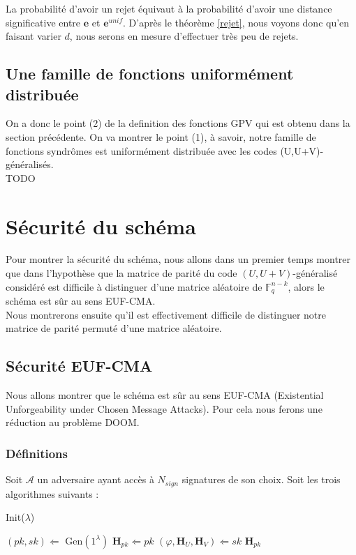 \documentclass[12pt]{article}
\theoremstyle{plain}
\newcommand{\F}{\mathbb{F}}
\newcommand{\e}{\mathbf{e}}
\begin{document}
La probabilité d'avoir un rejet équivaut à la probabilité d'avoir une distance significative entre $\e$ et $\e^{unif}$. D'après le théorème \ref{rejet}, nous voyons donc qu'en faisant varier $d$, nous serons en mesure d'effectuer très peu de rejets.


\subsection{Une famille de fonctions uniformément distribuée}
On a donc le point (2) de la definition des fonctions GPV qui est obtenu dans la section précédente. On va montrer le point (1), à savoir, notre famille de fonctions syndrômes est uniformément distribuée avec les codes (U,U+V)-généralisés. \\
TODO


\section{Sécurité du schéma}
Pour montrer la sécurité du schéma, nous allons dans un premier temps montrer que dans l'hypothèse que la matrice de parité du code $(U,U+V)$-généralisé considéré est difficile à distinguer d'une matrice aléatoire de $\F_q^{n-k}$, alors le schéma est sûr au sens EUF-CMA.\\
Nous montrerons ensuite qu'il est effectivement difficile de distinguer notre matrice de parité permuté d'une matrice aléatoire. \\

\subsection{Sécurité EUF-CMA}
Nous allons montrer que le schéma est sûr au sens EUF-CMA (Existential Unforgeability under Chosen Message Attacks). Pour cela nous ferons une réduction au problème DOOM.
\subsubsection{Définitions}

Soit $\mathcal{A}$ un adversaire ayant accès à $N_{sign}$ signatures de son choix. Soit les trois algorithmes suivants :


\begin{algorithm} [h]
	\caption{Init($\lambda$)}
	\begin{algorithmic}[1]
    	\STATE $(pk,sk) \Longleftarrow$ Gen$(1^\lambda)$ 
    	\STATE $\mathbf{H}_{pk} \Longleftarrow pk$
    	\STATE $(\varphi,\mathbf{H}_{U},\mathbf{H}_{V})\Longleftarrow sk$
    	\RETURN $\mathbf{H}_{pk}$
    \end{algorithmic}
\end{algorithm}
\end{document}
